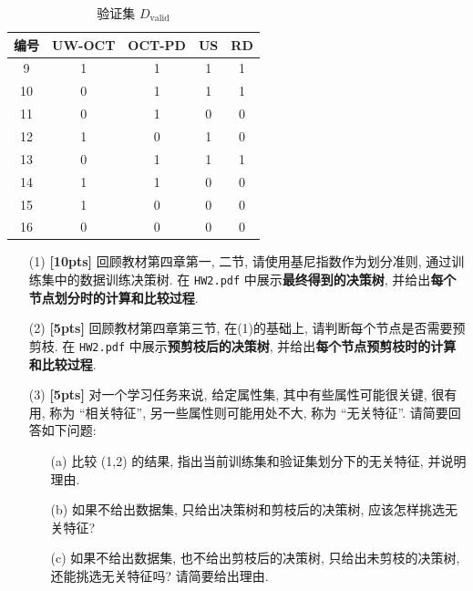 \documentclass[a4paper]{article}
\numberwithin{equation}{section}
\theoremstyle{definition}
\begin{document}
\begin{table}[ht]
	\centering
	\setlength{\abovecaptionskip}{0pt}
	\setlength{\belowcaptionskip}{5pt}
	\caption{验证集 $D_{\mathrm{valid}}$}
	\label{dt-valid}
	\begin{tabular}{cccc|c}
		\hline
		编号 & UW-OCT & OCT-PD & US & RD \\
		\hline
		9  & 1      & 1      & 1  & 1  \\
		10 & 0      & 1      & 1  & 1  \\
		11 & 0      & 1      & 0  & 0  \\
		12 & 1      & 0      & 1  & 0  \\
		13 & 0      & 1      & 1  & 1  \\
		14 & 1      & 1      & 0  & 0  \\
		15 & 1      & 0      & 0  & 0  \\
		16 & 0      & 0      & 0  & 0  \\
		\hline
	\end{tabular}
\end{table}

\begin{enumerate}
	\item[(1)] \textbf{[10pts]} 回顾教材第四章第一, 二节, 请使用基尼指数作为划分准则, 通过训练集中的数据训练决策树. 在 \texttt{HW2.pdf} 中展示\textbf{最终得到的决策树}, 并给出\textbf{每个节点划分时的计算和比较过程}.
	\item[(2)] \textbf{[5pts]} 回顾教材第四章第三节, 在(1)的基础上, 请判断每个节点是否需要预剪枝. 在 \texttt{HW2.pdf} 中展示\textbf{预剪枝后的决策树}, 并给出\textbf{每个节点预剪枝时的计算和比较过程}.
	\item[(3)] \textbf{[5pts]} 对一个学习任务来说, 给定属性集, 其中有些属性可能很关键, 很有用, 称为 ``相关特征'', 另一些属性则可能用处不大, 称为 ``无关特征''. 请简要回答如下问题:
	      \begin{itemize}
		      \item[(a)] 比较 (1,2) 的结果, 指出当前训练集和验证集划分下的无关特征, 并说明理由.
		      \item[(b)] 如果不给出数据集, 只给出决策树和剪枝后的决策树, 应该怎样挑选无关特征?
		      \item[(c)] 如果不给出数据集, 也不给出剪枝后的决策树, 只给出未剪枝的决策树, 还能挑选无关特征吗? 请简要给出理由.
	      \end{itemize}
\end{enumerate}
\end{document}
